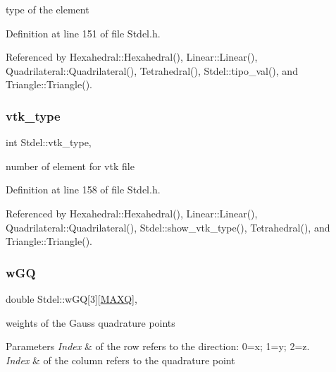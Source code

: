 type of the element 



Definition at line 151 of file Stdel.\+h.



Referenced by Hexahedral\+::\+Hexahedral(), Linear\+::\+Linear(), Quadrilateral\+::\+Quadrilateral(), Tetrahedral(), Stdel\+::tipo\+\_\+val(), and Triangle\+::\+Triangle().

\mbox{\label{classStdel_a55624584790a08437c03540489d04898}} 
\subsubsection{\texorpdfstring{vtk\+\_\+type}{vtk\_type}}
{\footnotesize\ttfamily int Stdel\+::vtk\+\_\+type\hspace{0.3cm}{\ttfamily [protected]}, {\ttfamily [inherited]}}



number of element for vtk file 



Definition at line 158 of file Stdel.\+h.



Referenced by Hexahedral\+::\+Hexahedral(), Linear\+::\+Linear(), Quadrilateral\+::\+Quadrilateral(), Stdel\+::show\+\_\+vtk\+\_\+type(), Tetrahedral(), and Triangle\+::\+Triangle().

\mbox{\label{classStdel_af99d72cbda49c30e23e83705c95a1c5b}} 
\subsubsection{\texorpdfstring{w\+GQ}{wGQ}}
{\footnotesize\ttfamily double Stdel\+::w\+GQ\mbox{[}3\mbox{]}\mbox{[}\hyperlink{MyOptions_8h_af708e94d886ba3f59582612949cac702}{M\+A\+XQ}\mbox{]}\hspace{0.3cm}{\ttfamily [protected]}, {\ttfamily [inherited]}}

weights of the Gauss quadrature points 
\begin{DoxyParams}{Parameters}
{\em Index} & of the row refers to the direction\+: 0=x; 1=y; 2=z. \\
\hline
{\em Index} & of the column refers to the quadrature point \\
\hline
\end{DoxyParams}


